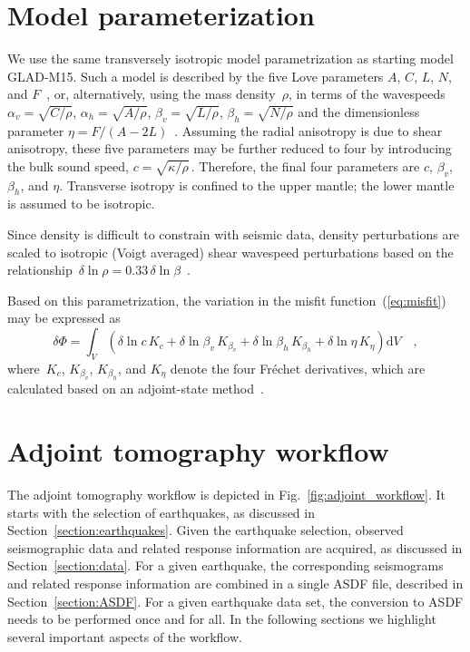 \section{Model parameterization}
\label{section:parameterization}

We use the same transversely isotropic model parametrization as starting model GLAD-M15.
Such a model is described by the five Love parameters $A$, $C$, $L$, $N$, and $F$~\cite{Love27},
or, alternatively, using the mass density~$\rho$, in terms of the wavespeeds~$\alpha_v=\sqrt{C/\rho}$, $\alpha_h=\sqrt{A/\rho}$, $\beta_v=\sqrt{L/\rho}$, $\beta_h=\sqrt{N/\rho}$ and the dimensionless parameter $\eta=F/(A-2L)$~\cite{PREM,DT98}.
Assuming the radial anisotropy is due to shear anisotropy, these five parameters
may be further reduced to four by introducing the bulk sound speed,
$c=\sqrt{\kappa/\rho}$\,.
Therefore, the final four parameters are $c$, $\beta_v$, $\beta_h$, and $\eta$.
Transverse isotropy is confined to the upper mantle; the lower mantle is assumed to be isotropic.

Since density is difficult to constrain with seismic data,
density perturbations are scaled to isotropic (Voigt averaged) shear wavespeed perturbations based on the relationship~$\delta\ln\rho = 0.33\,\delta\ln\beta$~\cite{montagner1989petrological}.

Based on this parametrization,
the variation in the misfit function~(\ref{eq:misfit}) may be expressed as~\cite{zhu2015seismic,bozdaug2016global}
\begin{equation}
    \delta \Phi = \int_V
      (\delta \ln c\,K_c + \delta \ln\beta_v\,K_{\beta_v} + \delta \ln\beta_h\,K_{\beta_h} +
      \delta\ln\eta\,K_\eta) \mathrm{d}V
      \quad ,
\end{equation}
where~$K_c$, $K_{\beta_v}$, $K_{\beta_h}$, and $K_\eta$ denote the four Fr\'echet derivatives,
which are calculated based on an adjoint-state method~\cite{Plessix_2006_RAS,Tromp2005}.

\section{Adjoint tomography workflow}
\label{section:workflow}

The adjoint tomography workflow is depicted in Fig.~\ref{fig:adjoint_workflow}.
It starts with the selection of earthquakes, as discussed in Section~\ref{section:earthquakes}.
Given the earthquake selection,
observed seismographic data and related response information are acquired,
as discussed in Section~\ref{section:data}.
For a given earthquake,
the corresponding seismograms and related response information are combined in a single ASDF file,
described in Section~\ref{section:ASDF}.
For a given earthquake data set, the conversion to ASDF needs to be performed once and for all.
In the following sections we highlight several important aspects of the workflow.

